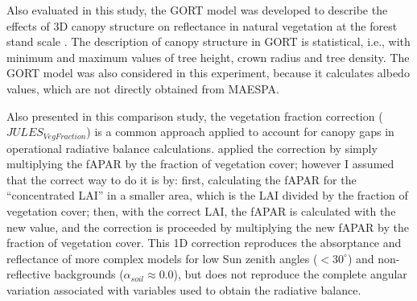 Also evaluated in this study, the GORT model was developed to describe the effects of 3D canopy structure on reflectance in natural vegetation at the forest stand scale \citep{Ni1999}. The description of canopy structure in GORT is statistical, i.e., with minimum and maximum values of tree height, crown radius and tree density. The GORT model was also considered in this experiment, because it calculates albedo values, which are not directly obtained from MAESPA.

Also presented in this comparison study, the vegetation fraction correction ($JULES_{VegFraction}$) is a common approach applied to account for canopy gaps in operational radiative balance calculations. \citet{Loew2014} applied the correction by simply multiplying the fAPAR by the fraction of vegetation cover; however I assumed that the correct way to do it is by: first, calculating the fAPAR for the “concentrated LAI” in a smaller area, which is the LAI divided by the fraction of vegetation cover; then, with the correct LAI, the fAPAR is calculated with the new value, and the correction is proceeded by multiplying the new fAPAR by the fraction of vegetation cover. This 1D correction reproduces the absorptance and reflectance of more complex models for low Sun zenith angles ($< 30^{\circ}$) and non-reflective backgrounds ($\alpha_{soil} \approx 0.0$), but does not reproduce the complete angular variation associated with variables used to obtain the radiative balance. 


